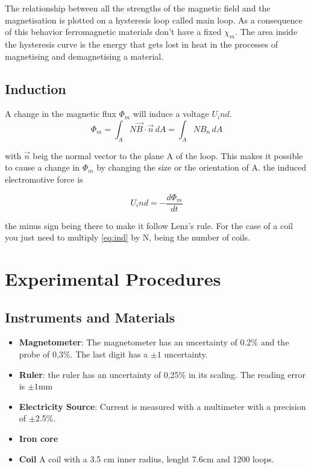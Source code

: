 \documentclass[12pt]{article}
\begin{document}
		
		The relationship between all the strengths of the magnetic field and the magnetisation is plotted on a hysteresis loop called main loop. As a consequence of this behavior ferromagnetic materials don't have a fixed $\chi_m$. The area inside the hysteresis curve is the energy that gets lost in heat in the processes of magnetising and demagnetising a material.
		
	\subsection{Induction} 
		A change in the magnetic flux $\Phi_m$ will induce a voltage $U_ind$. 
		\begin{equation}
		\Phi_m = \int_{A} N\vec{B}\cdot\vec{n}\,dA = \int_{A} NB_n\,dA 
		\end{equation}
	
	with $\vec{n}$ beig the normal vector to the plane A of the loop. This makes it possible to cause a change in $\Phi_m$ by changing the size or the orientation of A. the induced electromotive force is
	
	\begin{equation}\label{eq:ind}
		U_ind= -\frac{d\Phi_m}{dt}
	\end{equation}

	the minus sign being there to make it follow Lenz's rule. For the case of a coil you just need to multiply \ref{eq:ind} by N, being the number of coils.
	
		
	\section{Experimental Procedures}\label{sec:exp}
	\subsection{Instruments and Materials }
	\begin{itemize}
		\item {\bf Magnetometer}: The magnetometer has an uncertainty of 0.2\% and the probe of 0,3\%. The last digit has a $\pm1$ uncertainty. 
		\item {\bf Ruler}: the ruler has an uncertainty of 0,25\% in its scaling. The reading error is $\pm1$mm
		\item {\bf Electricity Source}: Current is measured with a multimeter with a precision of $\pm$2.5\%.
		\item {\bf Iron core} 
		\item {\bf Coil} A coil with a 3.5 cm inner radius, lenght 7.6cm and 1200 loops.
		
	\end{itemize}
\end{document}
